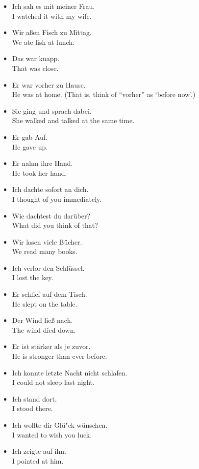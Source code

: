 \begin{itemize}
  \item  Ich sah es mit meiner Frau. \\ I watched it with my wife.
  \item  Wir a{\ss}en Fisch zu Mittag. \\ We ate fish at lunch.
  \item  Das war knapp. \\ That was close.
  \item  Er war vorher zu Hause. \\ He was at home.  (That is, think of ``vorher'' as `before now'.)
  \item  Sie ging und sprach dabei. \\ She walked and talked at the same time.
  \item  Er gab Auf. \\ He gave up.
  \item  Er nahm ihre Hand. \\ He took her hand.
  \item  Ich dachte sofort an dich. \\ I thought of you immediately.
  \item  Wie dachtest du dar{\"u}ber? \\ What did you think of that?
  \item  Wir lasen viele B{\"u}cher. \\ We read many books.
  \item  Ich verlor den Schl{\"u}ssel. \\ I lost the key.
  \item  Er schlief auf dem Tisch. \\ He slept on the table.
  \item  Der Wind lie{\ss} nach. \\ The wind died down.
  \item  Er ist st{\"a}rker als je zuvor. \\ He is stronger than ever before.
  \item  Ich konnte letzte Nacht nicht schlafen. \\ I could not sleep last night.
  \item  Ich stand dort. \\ I stood there.
  \item  Ich wollte dir Gl{\"u"}ck w{\"u}nschen. \\ I wanted to wish you luck.
  \item  Ich zeigte auf ihn. \\ I pointed at him.
\end{itemize}



